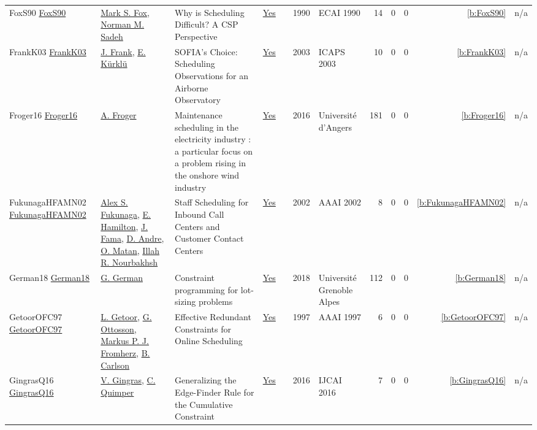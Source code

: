 {\begin{longtable}{>{\raggedright\arraybackslash}p{3cm}>{\raggedright\arraybackslash}p{6cm}>{\raggedright\arraybackslash}p{6.5cm}rrrp{2.5cm}rrrrr}
FoxS90 \href{}{FoxS90} & \hyperref[auth:a304]{Mark S. Fox}, \hyperref[auth:a1058]{Norman M. Sadeh} & Why is Scheduling Difficult? {A} {CSP} Perspective & \href{../works/FoxS90.pdf}{Yes} & \cite{FoxS90} & 1990 & ECAI 1990 & 14 & 0 & 0 & \ref{b:FoxS90} & n/a\\
FrankK03 \href{http://www.aaai.org/Library/ICAPS/2003/icaps03-023.php}{FrankK03} & \hyperref[auth:a382]{J. Frank}, \hyperref[auth:a383]{E. K{\"{u}}rkl{\"{u}}} & SOFIA's Choice: Scheduling Observations for an Airborne Observatory & \href{../works/FrankK03.pdf}{Yes} & \cite{FrankK03} & 2003 & ICAPS 2003 & 10 & 0 & 0 & \ref{b:FrankK03} & n/a\\
Froger16 \href{https://theses.hal.science/tel-01440836}{Froger16} & \hyperref[auth:a895]{A. Froger} & {Maintenance scheduling in the electricity industry : a particular focus on a problem rising in the onshore wind industry} & \href{../works/Froger16.pdf}{Yes} & \cite{Froger16} & 2016 & {Universit{\'e} d'Angers} & 181 & 0 & 0 & \ref{b:Froger16} & n/a\\
FukunagaHFAMN02 \href{http://www.aaai.org/Library/AAAI/2002/aaai02-123.php}{FukunagaHFAMN02} & \hyperref[auth:a1351]{Alex S. Fukunaga}, \hyperref[auth:a1352]{E. Hamilton}, \hyperref[auth:a1353]{J. Fama}, \hyperref[auth:a1354]{D. Andre}, \hyperref[auth:a1355]{O. Matan}, \hyperref[auth:a1356]{Illah R. Nourbakhsh} & Staff Scheduling for Inbound Call Centers and Customer Contact Centers & \href{../works/FukunagaHFAMN02.pdf}{Yes} & \cite{FukunagaHFAMN02} & 2002 & AAAI 2002 & 8 & 0 & 0 & \ref{b:FukunagaHFAMN02} & n/a\\
German18 \href{https://theses.hal.science/tel-01896325}{German18} & \hyperref[auth:a897]{G. German} & {Constraint programming for lot-sizing problems} & \href{../works/German18.pdf}{Yes} & \cite{German18} & 2018 & {Universit{\'e} Grenoble Alpes} & 112 & 0 & 0 & \ref{b:German18} & n/a\\
GetoorOFC97 \href{http://www.aaai.org/Library/AAAI/1997/aaai97-047.php}{GetoorOFC97} & \hyperref[auth:a1316]{L. Getoor}, \hyperref[auth:a859]{G. Ottosson}, \hyperref[auth:a1317]{Markus P. J. Fromherz}, \hyperref[auth:a1318]{B. Carlson} & Effective Redundant Constraints for Online Scheduling & \href{../works/GetoorOFC97.pdf}{Yes} & \cite{GetoorOFC97} & 1997 & AAAI 1997 & 6 & 0 & 0 & \ref{b:GetoorOFC97} & n/a\\
GingrasQ16 \href{http://www.ijcai.org/Abstract/16/440}{GingrasQ16} & \hyperref[auth:a315]{V. Gingras}, \hyperref[auth:a37]{C. Quimper} & Generalizing the Edge-Finder Rule for the Cumulative Constraint & \href{../works/GingrasQ16.pdf}{Yes} & \cite{GingrasQ16} & 2016 & IJCAI 2016 & 7 & 0 & 0 & \ref{b:GingrasQ16} & n/a\\

\end{longtable}}
